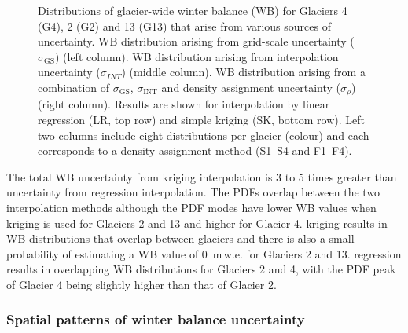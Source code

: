 \documentclass{sfuthesis}
\begin{document}
\begin{figure}[H]
	\centering
	\caption{Distributions of glacier-wide winter balance (WB) for Glaciers 4 (G4), 2 (G2) and 13 (G13) that arise from various sources of uncertainty. WB distribution arising from grid-scale uncertainty ($\sigma_{\mathrm{GS}}$) (left column). WB distribution arising from interpolation uncertainty ($\sigma_{INT}$) (middle column). WB distribution arising from a combination of $\sigma_{\mathrm{GS}}$, $\sigma_{\mathrm{INT}}$ and density assignment uncertainty ($\sigma_{\rho}$) (right column). Results are shown for interpolation by linear regression (LR, top row) and simple kriging (SK, bottom row). Left two columns include eight distributions per glacier (colour) and each corresponds to a density assignment method (S1--S4 and F1--F4).}
	\label{fig:WSMBDist_LR}
\end{figure}

The total WB uncertainty from kriging interpolation is 3 to 5 times greater than uncertainty from regression interpolation. The PDFs overlap between the two interpolation methods although the PDF modes have lower WB values when kriging is used for Glaciers 2 and 13 and higher for Glacier 4. kriging results in WB distributions that overlap between glaciers and there is also a small probability of estimating a WB value of 0 \,m\,w.e. for Glaciers 2 and 13. regression results in overlapping WB distributions for Glaciers 2 and 4, with the PDF peak of Glacier 4 being slightly higher than that of Glacier 2. 

\subsubsection{Spatial patterns of winter balance uncertainty}
\end{document}
